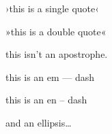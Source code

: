 
\def\mytitle{MultiMarkdown German Guillemets Test}


›this is a single quote‹

»this is a double quote«

this isn't an apostrophe.

this is an em --- dash

this is an en -- dash

and an ellipsis{\ldots}




